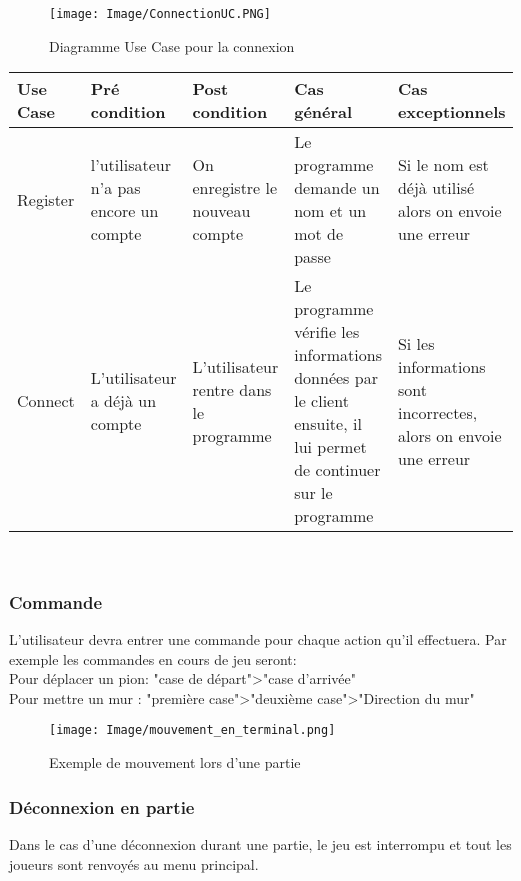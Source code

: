 \documentclass[french, utf8]{article}
\begin{document}
\begin{figure}[ht]
     \centering
    \texttt{[image: Image/ConnectionUC.PNG]}
\caption{Diagramme Use Case pour la connexion}
\end{figure}
\begin{center}
\begin{tabular}{|m{3cm}|m{3cm}|m{3cm}|m{3cm}|m{3cm}|}
\hline  Use Case & Pré condition      &  Post condition  & Cas général & Cas exceptionnels\\
\hline Register& l'utilisateur n'a pas encore un compte & On enregistre le nouveau compte & Le programme demande un nom et un mot de passe & Si le nom est déjà utilisé alors on envoie une erreur  \\
\hline Connect  & L'utilisateur a déjà un compte & L'utilisateur rentre dans le programme & Le programme vérifie les informations données par le client ensuite, il lui permet de continuer sur le programme & Si les informations sont incorrectes, alors on envoie une erreur \\

\hline
\end{tabular}\\
\end{center}

\newpage
\subsubsection{Commande}
L'utilisateur devra entrer une commande pour chaque action qu'il effectuera.
Par exemple les commandes en cours de jeu seront:\\
Pour déplacer un pion: "case de départ">"case d'arrivée"\\
Pour mettre un mur : "première case">"deuxième case">"Direction du mur"
\begin{figure}[ht]
     \centering
    \texttt{[image: Image/mouvement\_en\_terminal.png]}
    \caption{Exemple de mouvement lors d'une partie}
\end{figure}

\subsubsection{Déconnexion en partie}
Dans le cas d'une déconnexion durant une partie, le jeu est interrompu et tout les joueurs sont renvoyés au menu principal.
\end{document}
